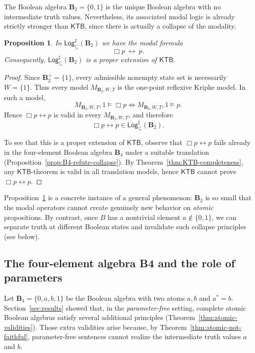 \documentclass[11pt]{amsart}
\theoremstyle{definition}
\theoremstyle{plain}
\newtheorem{proposition}[definition]{Proposition}
\newcommand{\Btwo}{\mathbf{B}_2}
\newcommand{\Bfour}{\mathbf{B}_4}
\newcommand{\KTB}{\mathsf{KTB}}
\newcommand{\Logsub}{\mathsf{Log}_{\subseteq}^{\sharp}}
\begin{document}
The Boolean algebra $\Btwo=\{0,1\}$ is the unique Boolean algebra with no intermediate truth values.
Nevertheless, its associated modal logic is already strictly stronger than $\KTB$, since there is actually a collapse of the modality.

\begin{proposition}\label{prop:B2-collapse}
In $\Logsub(\Btwo)$ we have the modal formula
\[
\Box p\ \leftrightarrow\ p.
\]
Consequently, $\Logsub(\Btwo)$ is a proper extension of $\KTB$.
\end{proposition}

\begin{proof}
Since $\Btwo^+=\{1\}$, every admissible nonempty state set is necessarily $W=\{1\}$.
Thus every model $M_{\Btwo,W,T}$ is the one-point reflexive Kripke model. In such a model,
\[
M_{\Btwo,W,T},1\models \Box p \iff M_{\Btwo,W,T},1\models p.
\]
Hence $\Box p\leftrightarrow p$ is valid in every $M_{\Btwo,W,T}$, and therefore
\[
\Box p\leftrightarrow p\in \Logsub(\Btwo).
\]

To see that this is a proper extension of $\KTB$, observe that $\Box p\leftrightarrow p$ fails already
in the four-element Boolean algebra $\Bfour$ under a suitable translation (Proposition~\ref{prop:B4-refute-collapse}).
By Theorem~\ref{thm:KTB-completeness}, any $\KTB$-theorem is valid in all translation models, hence
$\KTB$ cannot prove $\Box p\leftrightarrow p$.
\end{proof}

Proposition~\ref{prop:B2-collapse} is a concrete instance of a general phenomenon:
$\Btwo$ is so small that the modal operators cannot create genuinely new behavior on \emph{atomic} propositions.
By contrast, once $B$ has a nontrivial element $a\notin\{0,1\}$, we can separate truth at different Boolean
states and invalidate such collapse principles (see below).

\subsection{The four-element algebra B4 and the role of parameters}

Let $\Bfour=\{0,a,b,1\}$ be the Boolean algebra with two atoms $a,b$ and $a^\ast=b$.
Section~\ref{sec:results} showed that, in the \emph{parameter-free} setting, complete atomic Boolean algebras
satisfy several additional principles (Theorem~\ref{thm:atomic-validities}). Those extra validities arise
because, by Theorem~\ref{thm:atomic-not-faithful}, parameter-free sentences cannot realize the intermediate
truth values $a$ and $b$.
\end{document}
